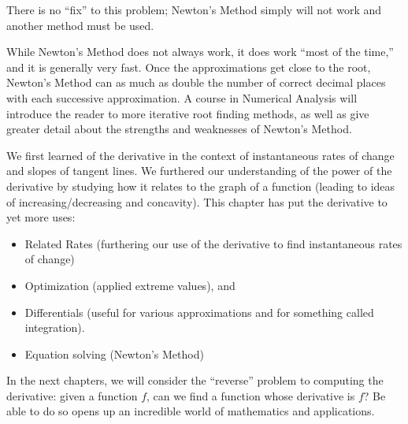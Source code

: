 There is no ``fix'' to this problem; Newton's Method simply will not work and another method must be used.


While Newton's Method does not always work, it does work ``most of the time,'' and it is generally very fast. Once the approximations get close to the root, Newton's Method can as much as double the number of correct decimal places with each successive approximation. A course in Numerical Analysis will introduce the reader to more iterative root finding methods, as well as give greater detail about the strengths and weaknesses of Newton's Method.\bigskip


We first learned of the derivative in the context of instantaneous rates of change and slopes of tangent lines. We furthered our understanding of the power of the derivative by studying how it relates to the graph of a function (leading to ideas of increasing/decreasing and concavity). This chapter has put the derivative to yet more uses:
\begin{itemize}
\item	Related Rates (furthering our use of the derivative to find instantaneous rates of change)
\item	Optimization (applied extreme values), and
\item	Differentials (useful for various approximations and for something called integration).
\item Equation solving (Newton's Method)
\end{itemize}

In the next chapters, we will consider the ``reverse'' problem to computing the derivative: given a function $f$, can we find a function whose derivative is $f$\primeskip? Be able to do so opens up an incredible world of mathematics and applications.


